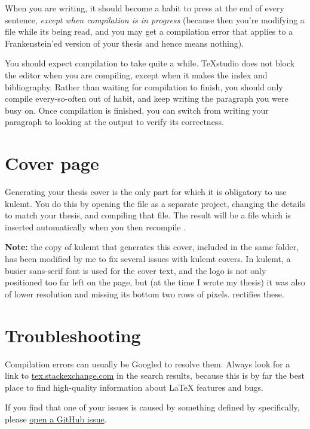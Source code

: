 When you are writing, it should become a habit to press  at the end of every sentence, \emph{except when compilation is in progress} (because then you're modifying a file while its being read, and you may get a compilation error that applies to a Frankenstein'ed version of your thesis and hence means nothing).

You should expect compilation to take quite a while. TeXstudio does not block the editor when you are compiling, except when it makes the index and bibliography. Rather than waiting for compilation to finish, you should only compile every-so-often out of habit, and keep writing the paragraph you were busy on. Once compilation is finished, you can switch from writing your paragraph to looking at the output to verify its correctness.

\section{Cover page}
Generating your thesis cover is the only part for which it is obligatory to use kulemt. You do this by opening the file  as a separate project, changing the details to match your thesis, and compiling that file. The result will be a file  which is inserted automatically when you then recompile .

\begin{mdframed}
\textbf{Note:} the copy of kulemt that generates this cover, included in the same folder, has been modified by me to fix several issues with kulemt covers. In kulemt, a busier sans-serif font is used for the cover text, and the logo is not only positioned too far left on the page, but (at the time I wrote my thesis) it was also of lower resolution and missing its bottom two rows of pixels. \repo rectifies these.
\end{mdframed}

\section{Troubleshooting}
Compilation errors can usually be Googled to resolve them. Always look for a link to \href{https://tex.stackexchange.com/}{tex.stackexchange.com} in the search results, because this is by far the best place to find high-quality information about \LaTeX{} features and bugs.

If you find that one of your issues is caused by something defined by \repo specifically, please \href{https://github.com/bauwenst/bauwemt/issues}{open a GitHub issue}.
